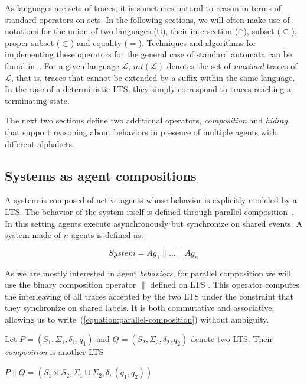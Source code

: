 As languages are sets of traces, it is sometimes natural to reason in terms of standard operators on sets. In the following sections, we will often make use of notations for the union of two languages ($\cup$), their intersection ($\cap$), subset ($\subseteq$), proper subset ($\subset$) and equality ($=$). Techniques and algorithms for implementing these operators for the general case of standard automata can be found in~\cite{Hopcroft:1979, Aho:1986}. For a given language $\mathcal{L}$, $mt(\mathcal{L})$ denotes the set of \emph{maximal} traces of $\mathcal{L}$, that is, traces that cannot be extended by a suffix within the same language. In the case of a deterministic LTS, they simply correspond to traces reaching a terminating state.

The next two sections define two additional operators, \emph{composition} and \emph{hiding}, that support reasoning about behaviors in presence of multiple agents with different alphabets.

\subsection{Systems as agent compositions}

A system is composed of active agents whose behavior is explicitly modeled by a LTS. The behavior of the system itself is defined through parallel composition~\cite{Hoare:1985}. In this setting agents execute asynchronously but synchronize on shared events. A system made of $n$ agents is defined as:

\begin{equation}
System = Ag_1 \parallel \ldots \parallel Ag_n
\label{equation:parallel-composition}
\end{equation}

As we are mostly interested in agent \emph{behaviors}, for parallel composition we will use the binary composition operator $\parallel$ defined on LTS \cite{Giannakopoulou:1999, Magee:1999}. This operator computes the interleaving of all traces accepted by the two LTS under the constraint that they synchronize on shared labels. It is both commutative and associative, allowing us to write~(\ref{equation:parallel-composition}) without ambiguity. 

Let $P = (S_1,\Sigma_1,\delta_1,q_{1})$ and $Q = (S_2,\Sigma_2,\delta_2,q_{2})$ denote two LTS. Their \emph{composition} is another LTS 

\begin{center}
$P \parallel Q = (S_1 \times S_2,\Sigma_1\cup\Sigma_2,\delta,(q_1,q_2))$
\end{center}

